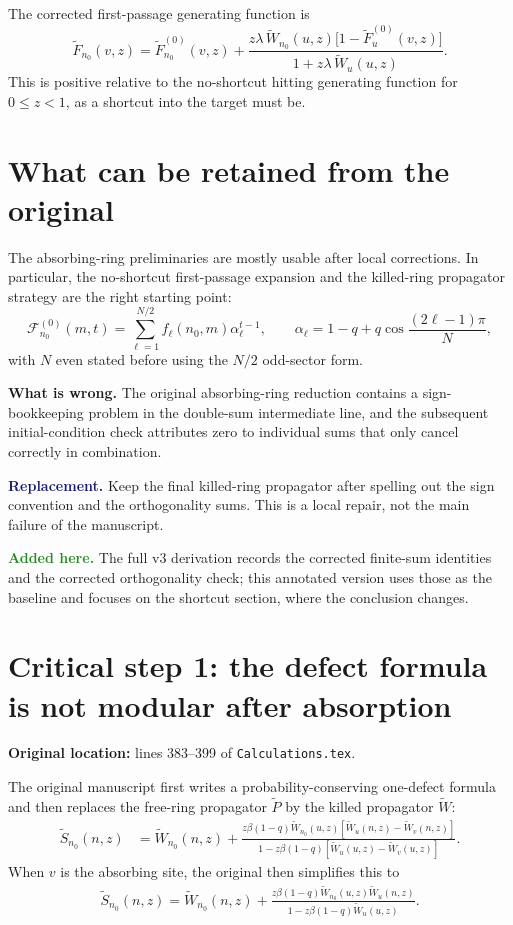 \documentclass[11pt]{article}
\newcommand{\wt}{\widetilde}
\newcommand{\Issue}[1]{\par\smallskip\noindent\textbf{\textcolor{BrickRed}{What is wrong.}} #1\par}
\newcommand{\Fix}[1]{\par\smallskip\noindent\textbf{\textcolor{MidnightBlue}{Replacement.}} #1\par}
\newcommand{\Added}[1]{\par\smallskip\noindent\textbf{\textcolor{ForestGreen}{Added here.}} #1\par}
\newcommand{\file}[1]{\texttt{#1}}
\begin{document}
The corrected first-passage generating function is
\begin{equation}
  \boxed{
  \wt F_{n_0}(v,z)=\wt F^{(0)}_{n_0}(v,z)+
  \frac{z\lambda\,\wt W_{n_0}(u,z)\bigl[1-\wt F^{(0)}_u(v,z)\bigr]}
  {1+z\lambda\,\wt W_u(u,z)}.}
  \label{eq:annotated-main-F}
\end{equation}
This is positive relative to the no-shortcut hitting generating function for
$0\leq z<1$, as a shortcut into the target must be.

\section{What can be retained from the original}

The absorbing-ring preliminaries are mostly usable after local corrections.  In
particular, the no-shortcut first-passage expansion and the killed-ring
propagator strategy are the right starting point:
\[
  \mathcal F_{n_0}^{(0)}(m,t)
  =\sum_{\ell=1}^{N/2}f_\ell(n_0,m)\alpha_\ell^{t-1},
  \qquad
  \alpha_\ell=1-q+q\cos\frac{(2\ell-1)\pi}{N},
\]
with $N$ even stated before using the $N/2$ odd-sector form.

\Issue{The original absorbing-ring reduction contains a sign-bookkeeping
problem in the double-sum intermediate line, and the subsequent
initial-condition check attributes zero to individual sums that only cancel
correctly in combination.}

\Fix{Keep the final killed-ring propagator after spelling out the sign
convention and the orthogonality sums.  This is a local repair, not the main
failure of the manuscript.}

\Added{The full v3 derivation records the corrected finite-sum identities and
the corrected orthogonality check; this annotated version uses those as the
baseline and focuses on the shortcut section, where the conclusion changes.}

\section{Critical step 1: the defect formula is not modular after absorption}

\textbf{Original location:} lines 383--399 of \file{Calculations.tex}.

The original manuscript first writes a probability-conserving one-defect
formula and then replaces the free-ring propagator $\wt P$ by the killed
propagator $\wt W$:
\begingroup\color{BrickRed}
\begin{align}
\wt S_{n_0}(n,z)
&=\wt W_{n_0}(n,z)
+\frac{z\beta(1-q)\wt W_{n_0}(u,z)
\left[\wt W_u(n,z)-\wt W_v(n,z)\right]}
{1-z\beta(1-q)\left[\wt W_u(u,z)-\wt W_v(u,z)\right]}.
\tag{O1}
\end{align}
\endgroup
When $v$ is the absorbing site, the original then simplifies this to
\begingroup\color{BrickRed}
\begin{align}
\wt S_{n_0}(n,z)
=\wt W_{n_0}(n,z)
+\frac{z\beta(1-q)\wt W_{n_0}(u,z)\wt W_u(n,z)}
{1-z\beta(1-q)\wt W_u(u,z)}.
\tag{O2}
\end{align}
\endgroup
\end{document}
